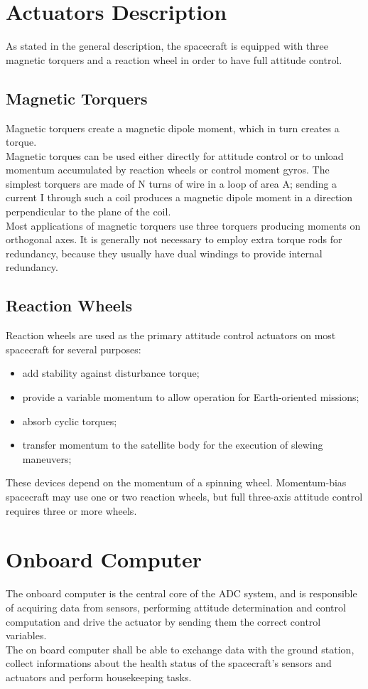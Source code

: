\documentclass[11pt,a4paper]{report}
\begin{document}
\section{Actuators Description}
As stated in the general description, the spacecraft is equipped with three magnetic torquers and a reaction wheel in order to have full attitude control.
\subsection{Magnetic Torquers}
Magnetic torquers create a magnetic dipole moment, which in turn creates a
torque.\\
Magnetic torques can be used either directly for attitude control or to unload momentum accumulated by reaction wheels or control moment gyros. The simplest torquers are made of N turns of wire in a loop of area A; sending a current
I through such a coil produces a magnetic dipole moment in a direction perpendicular to the plane of the coil. \\
Most applications of magnetic torquers use three torquers producing moments
on orthogonal axes. It is generally not necessary to employ extra torque rods
for redundancy, because they usually have dual windings to provide internal
redundancy. 

\subsection{Reaction Wheels}
Reaction wheels are used as the primary attitude control actuators on most spacecraft for several purposes: 

\begin{itemize}
 \item add stability against disturbance torque;
 \item provide a variable momentum to allow operation for Earth-oriented missions;
 \item absorb cyclic torques;
 \item transfer momentum to the satellite body for the execution of slewing maneuvers;
\end{itemize}

These devices depend on the momentum of a spinning wheel.
Momentum-bias spacecraft may use one or two reaction wheels, but
full three-axis attitude control requires three or more wheels.

\section{Onboard Computer}
The onboard computer is the central core of the ADC system, and is responsible of acquiring data from sensors, performing attitude determination and control computation and drive the actuator by sending them the correct control variables.\\
The on board computer shall be able to exchange data with the ground station, collect informations about the health status of the spacecraft's sensors and actuators and perform housekeeping tasks.
\end{document}

